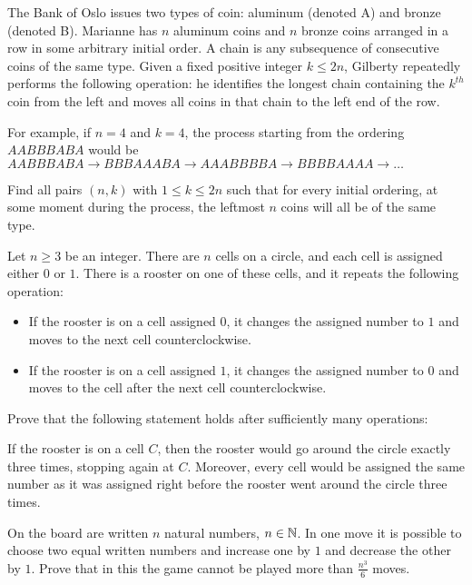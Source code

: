 \begin{problem}[IMO 2022]
    The Bank of Oslo issues two types of coin: aluminum (denoted A) and bronze (denoted B). Marianne has $n$ aluminum coins and $n$ bronze coins arranged in a row in some arbitrary initial order. A chain is any subsequence of consecutive coins of the same type. Given a fixed positive integer $k \leq 2n$, Gilberty repeatedly performs the following operation: he identifies the longest chain containing the $k^{th}$ coin from the left and moves all coins in that chain to the left end of the row.

    For example, if $n=4$ and $k=4$, the process starting from the ordering $AABBBABA$ would be $AABBBABA \to BBBAAABA \to AAABBBBA \to BBBBAAAA \to \dots$

    Find all pairs $(n,k)$ with $1 \leq k \leq 2n$ such that for every initial ordering, at some moment during the process, the leftmost $n$ coins will all be of the same type.
\end{problem}

\begin{problem}[APMO 2025]
    Let $n \geq 3$ be an integer. There are $n$ cells on a circle, and each cell is assigned either $0$ or $1$. There is a rooster on one of these cells, and it repeats the following operation:
    \begin{itemize}
        \item If the rooster is on a cell assigned $0$, it changes the assigned number to $1$ and moves to the next cell counterclockwise.
        \item If the rooster is on a cell assigned $1$, it changes the assigned number to $0$ and moves to the cell after the next cell counterclockwise.
    \end{itemize}
    Prove that the following statement holds after sufficiently many operations:

    If the rooster is on a cell $C$, then the rooster would go around the circle exactly three times, stopping again at $C$. Moreover, every cell would be assigned the same number as it was assigned right before the rooster went around the circle three times.
\end{problem}

\begin{problem}[Serbia 2022]
    On the board are written $n$ natural numbers, $n\in \mathbb N$. In one move it is possible to choose two equal written numbers and increase one by $1$ and decrease the other by $1$. Prove that in this the game cannot be played more than $\frac{n^3}{6}$ moves.
\end{problem}

